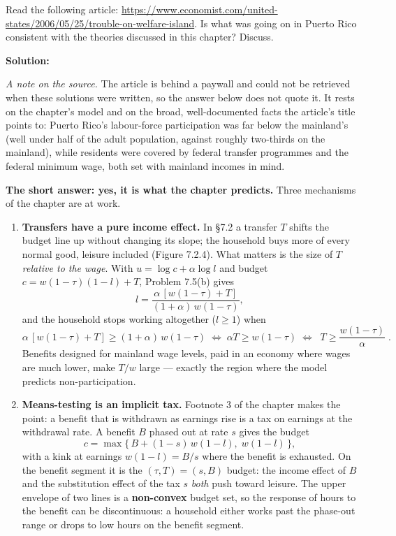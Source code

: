 \documentclass[12pt, letterpaper]{article}
\begin{document}
\begin{tcolorbox}[evenbox,title={Problem 7.4 \quad Puerto Rico}]
\begin{tcolorbox}[questionbox]
Read the following article:
\url{https://www.economist.com/united-states/2006/05/25/trouble-on-welfare-island}. Is what
was going on in Puerto Rico consistent with the theories discussed in this chapter? Discuss.
\end{tcolorbox}

\textbf{Solution:}

\emph{A note on the source.} The article is behind a paywall and could not be retrieved when
these solutions were written, so the answer below does not quote it. It rests on the
chapter's model and on the broad, well-documented facts the article's title points to:
Puerto Rico's labour-force participation was far below the mainland's (well under half of
the adult population, against roughly two-thirds on the mainland), while residents were
covered by federal transfer programmes and the federal minimum wage, both set with mainland
incomes in mind.

\textbf{The short answer: yes, it is what the chapter predicts.} Three mechanisms of the
chapter are at work.

\begin{enumerate}
\item \textbf{Transfers have a pure income effect.} In \S7.2 a transfer $T$ shifts the budget
line up without changing its slope; the household buys more of every normal good, leisure
included (Figure 7.2.4). What matters is the size of $T$ \emph{relative to the wage}. With
$u=\log c+\alpha\log l$ and budget $c=w(1-\tau)(1-l)+T$, Problem 7.5(b) gives
\[
l=\frac{\alpha\,[w(1-\tau)+T]}{(1+\alpha)\,w(1-\tau)} ,
\]
and the household stops working altogether ($l\ge1$) when
\[
\alpha\,[w(1-\tau)+T]\ge(1+\alpha)\,w(1-\tau)
\;\Longleftrightarrow\;
\alpha T\ge w(1-\tau)
\;\Longleftrightarrow\;
\boxed{\;T\ge\frac{w(1-\tau)}{\alpha}\;}.
\]
Benefits designed for mainland wage levels, paid in an economy where wages are much lower,
make $T/w$ large --- exactly the region where the model predicts non-participation.

\item \textbf{Means-testing is an implicit tax.} Footnote 3 of the chapter makes the point: a
benefit that is withdrawn as earnings rise is a tax on earnings at the withdrawal rate. A
benefit $B$ phased out at rate $s$ gives the budget
\[
c=\max\big\{\,B+(1-s)\,w(1-l),\;w(1-l)\,\big\},
\]
with a kink at earnings $w(1-l)=B/s$ where the benefit is exhausted. On the benefit segment
it is the $(\tau,T)=(s,B)$ budget: the income effect of $B$ and the substitution effect of the
tax $s$ \emph{both} push toward leisure. The upper envelope of two lines is a \textbf{non-convex}
budget set, so the response of hours to the benefit can be discontinuous: a household either
works past the phase-out range or drops to low hours on the benefit segment.


\end{enumerate}
\end{tcolorbox}
\end{document}
